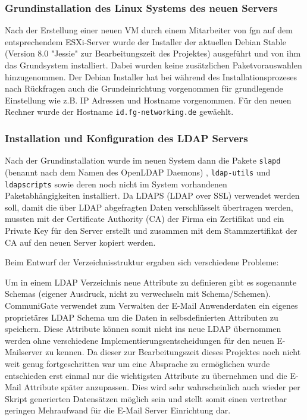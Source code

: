 \documentclass[11pt,a4paper,titlepage=firstiscover]{scrartcl} %
\begin{document}
\subsubsection{Grundinstallation des Linux Systems des neuen Servers}
Nach der Erstellung einer neuen VM durch einem Mitarbeiter von fgn auf dem entsprechendem ESXi-Server wurde der Installer der aktuellen Debian Stable (Version 8.0 "Jessie" zur Bearbeitungszeit des Projektes) ausgeführt und von ihm das Grundsystem installiert. Dabei wurden keine zusätzlichen Paketvorauswahlen hinzugenommen.  Der Debian Installer hat bei während des Installationsprozeses nach Rückfragen auch die Grundeinrichtung vorgenommen für grundlegende Einstellung wie z.B. IP Adressen und Hostname vorgenommen. Für den neuen Rechner wurde der Hostname \texttt{id.fg-networking.de} gewäehlt.

\subsubsection{Installation und Konfiguration des LDAP Servers}
Nach der Grundinstallation wurde im neuen System dann die Pakete \texttt{slapd} (benannt nach dem Namen des OpenLDAP Daemons) , \texttt{ldap-utils} und \texttt{ldapscripts} sowie deren noch nicht im System vorhandenen Paketabhängigkeiten installiert. Da LDAPS (LDAP over SSL) verwendet werden soll, damit die über LDAP abgefragten Daten verschlüsselt übertragen werden, mussten mit der Certificate Authority (CA) der Firma ein Zertifikat und ein Private Key für den Server erstellt und zusammen mit dem Stammzertifikat der CA auf den neuen Server kopiert werden.

\medskip Beim Entwurf der Verzeichnisstruktur ergaben sich verschiedene Probleme:

\noindent Um in einem LDAP Verzeichnis neue Attribute zu definieren gibt es sogenannte Schemas (eigener Ausdruck, nicht zu verwechseln mit Schema/Schemen). CommuniGate verwendet zum Verwalten der E-Mail Anwenderdaten ein eigenes proprietäres LDAP Schema um die Daten in selbsdefinierten Attributen zu speichern. Diese Attribute können somit nicht ins neue LDAP übernommen werden ohne verschiedene Implementierungsentscheidungen für den neuen E-Mailserver zu kennen. Da dieser zur Bearbeitungszeit dieses Projektes noch nicht weit genug fortgeschritten war um eine Absprache zu ermöglichen wurde entschieden erst einmal nur die wichtigsten Attribute zu übernehmen und die E-Mail Attribute später anzupassen. Dies wird sehr wahrscheinlich auch wieder per Skript generierten Datensätzen möglich sein und stellt somit einen vertretbar geringen Mehraufwand für die E-Mail Server Einrichtung dar.
\end{document}
